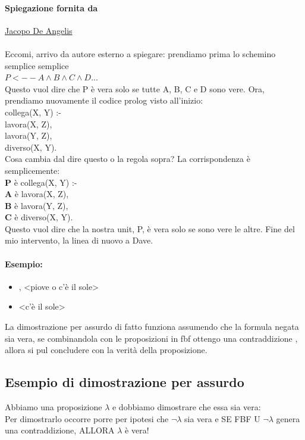 \documentclass[12pt, a4paper, openany, oneside]{book}
\newcommand\tab[1][1cm]{\hspace*{#1}}
\begin{document}
{\paragraph{Spiegazione fornita da} \href{https://github.com/JacopoDeAngelis}
{Jacopo De Angelis} \\ \\
Eccomi, arrivo da autore esterno a spiegare: prendiamo prima lo schemino semplice
semplice \\
$ P <-- A \wedge B \wedge C \wedge D ...$ \\
Questo vuol dire che P è vera solo se tutte A, B, C e D sono vere. Ora, prendiamo 
nuovamente il codice prolog visto all'inizio: \\
\color{red}
collega(X, Y) :-  \\	
\tab lavora(X, Z), \\	
\tab lavora(Y, Z), \\	
\tab diverso(X, Y). \color{black}\\
Cosa cambia dal dire questo o la regola sopra? La corrispondenza è semplicemente: \\
\color{red}
\textbf{P} è collega(X, Y) :-  \\	
\tab \textbf{A} è lavora(X, Z), \\	
\tab \textbf{B} è lavora(Y, Z), \\	
\tab \textbf{C} è diverso(X, Y). \color{black}\\
Questo vuol dire che la nostra unit, P, è vera solo se sono vere le altre. Fine 
del mio intervento, la linea di nuovo a Dave.
\paragraph{Esempio:} 
\begin{itemize}
	\item <non piove>, <piove o c'è il sole>
	\item <c'è il sole>
\end{itemize}
La dimostrazione per assurdo di fatto funziona assumendo che la formula negata
sia vera, se combinandola con le proposizioni in fbf ottengo una contraddizione
, allora si pul concludere con la verità della proposizione.
\subsection{Esempio di dimostrazione per assurdo}
Abbiamo una proposizione $\lambda$ e dobbiamo dimostrare che essa sia vera: \\
Per dimostrarlo occorre porre per ipotesi che $\neg \lambda$ sia vera e 
\color{red}SE \color{black} FBF U {$\neg \lambda$} genera una contraddizione,
\color{red}ALLORA \color{black} $\lambda$ è vera!
}
\end{document}
